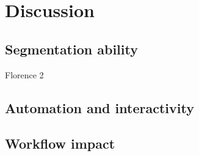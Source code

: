 \chapter{Discussion}

\section{Segmentation ability}
Florence 2 \parencite{Wang2025OBIFloSAM}
\section{Automation and interactivity}
\section{Workflow impact}